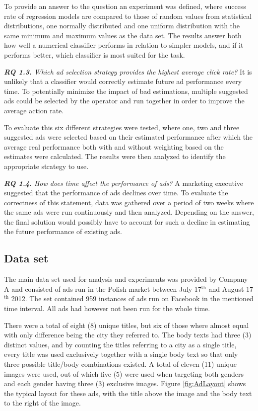 \documentclass{sig-alternate}
\newcommand{\superscript}[1]{\ensuremath{^{\textrm{#1}}}}
\begin{document}
To provide an answer to the question an experiment was defined, where success rate of regression models are compared to those of random values from statistical distributions, one normally distributed and one uniform distribution with the same minimum and maximum values as the data set. The results answer both how well a numerical classifier performs in relation to simpler models, and if it performs better, which classifier is most suited for the task.

\textit{\textbf{RQ 1.3.} Which ad selection strategy provides the highest average click rate?}
It is unlikely that a classifier would correctly estimate future ad performance every time. To potentially minimize the impact of bad estimations, multiple suggested ads could be selected by the operator and run together in order to improve the average action rate.

To evaluate this six different strategies were tested, where one, two and three suggested ads were selected based on their estimated performance after which the average real performance both with and without weighting based on the estimates were calculated. The results were then analyzed to identify the appropriate strategy to use.

\textit{\textbf{RQ 1.4.} How does time affect the performance of ads?}
A marketing executive suggested that the performance of ads declines over time. To evaluate the correctness of this statement, data was gathered over a period of two weeks where the same ads were run continuously and then analyzed. Depending on the answer, the final solution would possibly have to account for such a decline in estimating the future performance of existing ads.

\subsection{Data set}
The main data set used for analysis and experiments was provided by Company A and consisted of ads run in the Polish market between July 17\superscript{th} and August 17\superscript{th} 2012. The set contained 959 instances of ads run on Facebook in the mentioned time interval. All ads had however not been run for the whole time.

There were a total of eight (8) unique titles, but six of those where almost equal with only difference being the city they referred to. The body texts had three (3) distinct values, and by counting the titles referring to a city as a single title, every title was used exclusively together with a single body text so that only three possible title/body combinations existed. A total of eleven (11) unique images were used, out of which five (5) were used when targeting both genders and each gender having three (3) exclusive images. Figure \ref{fig:AdLayout} shows the typical layout for these ads, with the title above the image and the body text to the right of the image.
\end{document}
